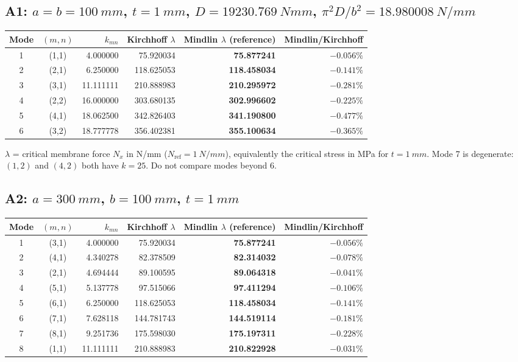 \documentclass[11pt,a4paper]{report}
\newcommand{\refval}[1]{\textbf{#1}}
\begin{document}
\subsection*{A1: $a=b=\SI{100}{mm}$, $t=\SI{1}{mm}$, $D=\SI{19230.769}{Nmm}$, $\pi^2D/b^2=\SI{18.980008}{N/mm}$}
\begin{center}
\begin{tabular}{@{}ccrrrr@{}}
\toprule
Mode & $(m,n)$ & $k_{mn}$ & Kirchhoff $\lambda$ & \refval{Mindlin $\lambda$ (reference)} & Mindlin/Kirchhoff \\
\midrule
1 & (1,1) & 4.000000 & 75.920034 & \refval{75.877241} & $-0.056\%$ \\
2 & (2,1) & 6.250000 & 118.625053 & \refval{118.458034} & $-0.141\%$ \\
3 & (3,1) & 11.111111 & 210.888983 & \refval{210.295972} & $-0.281\%$ \\
4 & (2,2) & 16.000000 & 303.680135 & \refval{302.996602} & $-0.225\%$ \\
5 & (4,1) & 18.062500 & 342.826403 & \refval{341.190800} & $-0.477\%$ \\
6 & (3,2) & 18.777778 & 356.402381 & \refval{355.100634} & $-0.365\%$ \\
\bottomrule
\end{tabular}
\end{center}
$\lambda$ = critical membrane force $N_x$ in \si{N/mm} ($N_\text{ref}=\SI{1}{N/mm}$),
equivalently the critical stress in \si{MPa} for $t=\SI{1}{mm}$.
Mode 7 is degenerate: $(1,2)$ and $(4,2)$ both have $k=25$. Do not compare
modes beyond 6.

\subsection*{A2: $a=\SI{300}{mm}$, $b=\SI{100}{mm}$, $t=\SI{1}{mm}$}
\begin{center}
\begin{tabular}{@{}ccrrrr@{}}
\toprule
Mode & $(m,n)$ & $k_{mn}$ & Kirchhoff $\lambda$ & \refval{Mindlin $\lambda$ (reference)} & Mindlin/Kirchhoff \\
\midrule
1 & (3,1) & 4.000000 & 75.920034 & \refval{75.877241} & $-0.056\%$ \\
2 & (4,1) & 4.340278 & 82.378509 & \refval{82.314032} & $-0.078\%$ \\
3 & (2,1) & 4.694444 & 89.100595 & \refval{89.064318} & $-0.041\%$ \\
4 & (5,1) & 5.137778 & 97.515066 & \refval{97.411294} & $-0.106\%$ \\
5 & (6,1) & 6.250000 & 118.625053 & \refval{118.458034} & $-0.141\%$ \\
6 & (7,1) & 7.628118 & 144.781743 & \refval{144.519114} & $-0.181\%$ \\
7 & (8,1) & 9.251736 & 175.598030 & \refval{175.197311} & $-0.228\%$ \\
8 & (1,1) & 11.111111 & 210.888983 & \refval{210.822928} & $-0.031\%$ \\
\bottomrule
\end{tabular}
\end{center}
\end{document}
